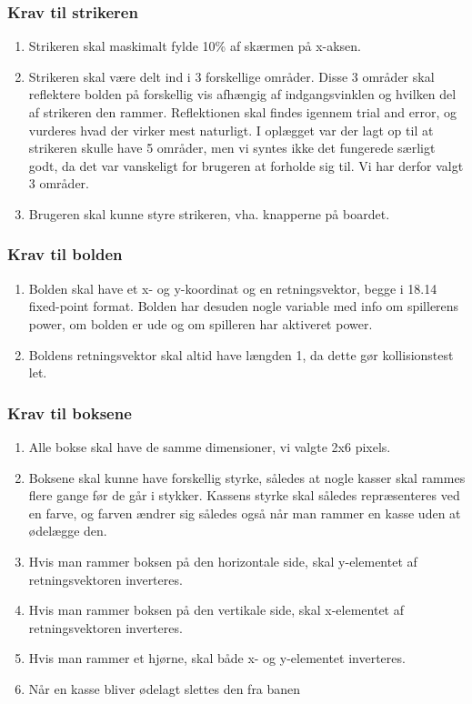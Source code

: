 \subsubsection{Krav til strikeren}
\begin{enumerate}
\item Strikeren skal maskimalt fylde 10\% af skærmen på x-aksen. 
\item  Strikeren skal være delt ind i 3 forskellige områder. Disse 3 områder skal reflektere bolden på forskellig vis afhængig af indgangsvinklen og hvilken del af strikeren den rammer. Reflektionen skal findes igennem trial and error, og vurderes hvad der virker mest naturligt. I oplægget var der lagt op til at strikeren skulle have 5 områder, men vi syntes ikke det fungerede særligt godt, da det var vanskeligt for brugeren at forholde sig til. Vi har derfor valgt 3 områder.
\item Brugeren skal kunne styre strikeren, vha. knapperne på boardet.
\end{enumerate}
\subsubsection{Krav til bolden}
\label{Ballkrav}
\begin{enumerate}
\item Bolden skal have et x- og y-koordinat og en retningsvektor, begge i 18.14 fixed-point format. Bolden har desuden nogle variable med info om spillerens power, om bolden er ude og om spilleren har aktiveret power.
\item Boldens retningsvektor skal altid have længden 1, da dette gør kollisionstest let.

\end{enumerate}
\subsubsection{Krav til boksene}
\begin{enumerate}
\item Alle bokse skal have de samme dimensioner, vi valgte 2x6 pixels.
\item Boksene skal kunne have forskellig styrke, således at nogle kasser skal rammes flere gange før de går i stykker. Kassens styrke skal således repræsenteres ved en farve, og farven ændrer sig således også når man rammer en kasse uden at ødelægge den.
\item Hvis man rammer boksen på den horizontale side, skal y-elementet af retningsvektoren inverteres. 
\item Hvis man rammer boksen på den vertikale side, skal x-elementet af retningsvektoren inverteres.
\item Hvis man rammer et hjørne, skal både x- og y-elementet inverteres.
\item Når en kasse bliver ødelagt slettes den fra banen
\end{enumerate}


